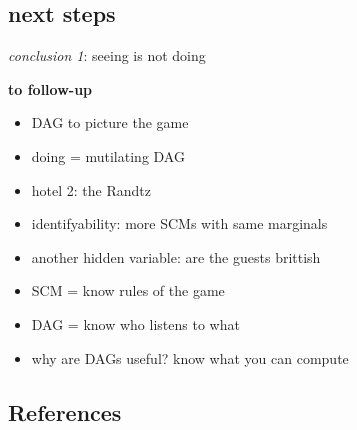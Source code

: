 \documentclass[
  letterpaper,
  DIV=11,
  numbers=noendperiod]{scrartcl}
\providecommand{\tightlist}{%
  \setlength{\itemsep}{0pt}\setlength{\parskip}{0pt}}\usepackage{longtable,booktabs,array}
\begin{document}
\begin{figure}
\begin{minipage}{0.33\linewidth}
{}


\end{minipage}%
%
\begin{minipage}{0.33\linewidth}



\end{minipage}%

\end{figure}%

\subsection{next steps}\label{next-steps}

\emph{conclusion 1}: seeing is not doing

\textbf{to follow-up}

\begin{itemize}
\tightlist
\item
  DAG to picture the game
\item
  doing = mutilating DAG
\item
  hotel 2: the Randtz
\item
  identifyability: more SCMs with same marginals
\item
  another hidden variable: are the guests brittish
\item
  SCM = know rules of the game
\item
  DAG = know who listens to what
\item
  why are DAGs useful? know what you can compute
\end{itemize}

\subsection{References}\label{references}
\end{document}
